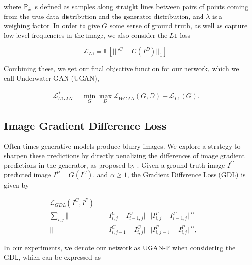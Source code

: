 \documentclass[conference,reqno]{IEEEtran}
\begin{document}
\noindent where $\mathbb{P}_{\hat{x}}$ is defined as samples along straight lines between pairs of points coming from
the true data distribution and the generator distribution, and $\lambda$ is a weighing factor. In order to give $G$
some sense of ground truth, as well as capture low level frequencies in the image, we also consider the $L1$ loss

\begin{equation}
   \mathcal{L}_{L1} = \mathbb{E} [ || I^C - G(I^D) ||_1 ].
\end{equation}

\noindent Combining these, we get our final objective function for our network, which we call Underwater GAN (UGAN),

\begin{equation}
   \begin{aligned}
      \mathcal{L}_{UGAN}^* = \min\limits_{G}\max\limits_{D} \mathcal{L}_{WGAN}(G,D) + \mathcal{L}_{L1}(G).
   \end{aligned}
\end{equation}


\subsection{Image Gradient Difference Loss}
Often times generative models produce blurry images. We explore a strategy to sharpen these predictions by
directly penalizing the differences of image gradient predictions in the generator, as proposed by
\cite{mathieu2015deep}. Given a ground truth image $I^C$, predicted image $I^P = G(I^C)$, and $\alpha \geq 1$, the
Gradient Difference Loss (GDL) is given by

\begin{equation}
   \begin{aligned}
      \mathcal{L}_{GDL}(I^C, I^P) = \\ \sum\limits_{i,j} || & I^C_{i,j} - I^C_{i-1,j}| - | I^P_{i,j} - I^P_{i-1,j}||^{\alpha} + \\
      || & I^C_{i,j-1} - I^C_{i,j}| - | I^P_{i,j-1} - I^P_{i,j}||^{\alpha},
   \end{aligned}
\end{equation}

\noindent In our experiments, we denote our network as UGAN-P when considering the GDL, which can be expressed as
\end{document}
